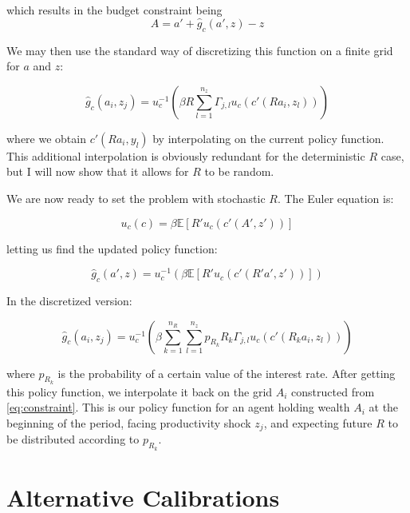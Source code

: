 \documentclass[12pt]{article}
\begin{document}
which results in the budget constraint being
\begin{equation}
    A = a' + \hat{g}_c(a',z) - z \label{eq:constraint}
\end{equation}

We may then use the standard way of discretizing this function on a finite grid for $a$ and $z$:

\begin{equation}
    \hat{g}_c(a_i, z_j) = u_c^{-1} \left( \beta R \sum_{l=1}^{n_z} \Gamma_{j,l} u_c \left( c'(R a_i, z_l) \right) \right)
\end{equation}

where we obtain $c'(R a_i, y_l)$ by interpolating on the current policy function. This additional interpolation is obviously redundant for the deterministic $R$ case, but I will now show that it allows for $R$ to be random.

We are now ready to set the problem with stochastic $R$. The Euler equation is:

\begin{equation}
    u_c(c) = \beta \mathbb{E}[R' u_c(c'(A',z'))]
\end{equation}

 letting us find the updated policy function:

\begin{equation}
    \hat{g}_c(a',z) = u_c^{-1} \left( \beta \mathbb{E}[R' u_c(c'(R' a',z'))] \right)
\end{equation}

In the discretized version:

\begin{equation}
    \hat{g}_c(a_i, z_j) = u_c^{-1} \left( \beta \sum_{k=1}^{n_R}  \sum_{l=1}^{n_z} p_{R_k} R_k \Gamma_{j,l} u_c \left( c'(R_k a_i, z_l) \right) \right)
\end{equation}

where $p_{R_k}$ is the probability of a certain value of the interest rate. After getting this policy function, we interpolate it back on the grid $A_i$ constructed from \eqref{eq:constraint}. This is our policy function for an agent holding wealth $A_i$ at the beginning of the period, facing productivity shock $z_j$, and expecting future $R$ to be distributed according to  $p_{R_k}$.

\newpage

\section{Alternative Calibrations}
\label{app:alt_cali}
\end{document}
